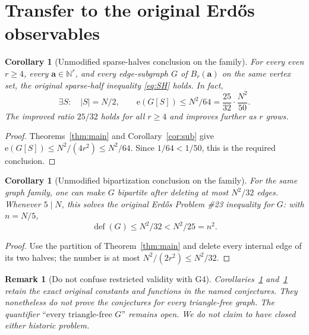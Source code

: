 \documentclass[11pt,a4paper]{article}
\newtheorem{corollary}[theorem]{Corollary}
\newtheorem{remark}[theorem]{Remark}
\newcommand{\edges}{\mathrm e}
\newcommand{\defect}{\operatorname{def}}
\newcommand{\card}[1]{\lvert#1\rvert}
\newcommand{\N}{\mathbb N}
\begin{document}
\section{Transfer to the original Erd\H{o}s observables}
\begin{corollary}[Unmodified sparse-halves conclusion on the family]\label{cor:SH}
For every even $r\ge4$, every $\mathbf a\in\N^r$, and every edge-subgraph $G$ of $B_r(\mathbf a)$ on the same vertex set, the original sparse-half inequality \eqref{eq:SH} holds. In fact,
\[
 \exists S:\quad \card S=N/2,\qquad
 \edges(G[S])\le N^2/64
 =\frac{25}{32}\cdot\frac{N^2}{50}.
\]
The improved ratio $25/32$ holds for all $r\ge4$ and improves further as $r$ grows.
\end{corollary}
\begin{proof}
Theorems~\ref{thm:main} and Corollary~\ref{cor:sub} give $\edges(G[S])\le N^2/(4r^2)\le N^2/64$. Since $1/64<1/50$, this is the required conclusion.
\end{proof}
\begin{corollary}[Unmodified bipartization conclusion on the family]\label{cor:BIP}
For the same graph family, one can make $G$ bipartite after deleting at most $N^2/32$ edges. Whenever $5\mid N$, this solves the original Erd\H{o}s Problem \#23 inequality for $G$: with $n=N/5$,
\[
 \defect(G)\le N^2/32<N^2/25=n^2.
\]
\end{corollary}
\begin{proof}
Use the partition of Theorem~\ref{thm:main} and delete every internal edge of its two halves; the number is at most $N^2/(2r^2)\le N^2/32$.
\end{proof}
\begin{remark}[Do not confuse restricted validity with G4]
Corollaries~\ref{cor:SH} and~\ref{cor:BIP} retain the exact original constants and functions in the named conjectures. They nonetheless do \emph{not} prove the conjectures for every triangle-free graph. The quantifier $\text{``every triangle-free }G\text{''}$ remains open. We do not claim to have closed either historic problem.
\end{remark}
\end{document}
